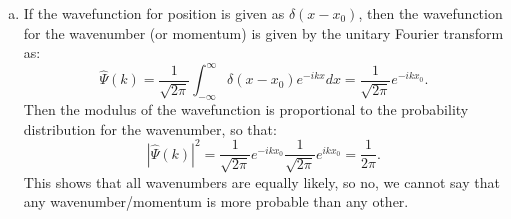 \begin{enumerate}
\begin{enumerate}[a)]
\item If the wavefunction for position is given as $\delta(x - x_0)$, then the wavefunction for the wavenumber (or momentum)
is given by the unitary Fourier transform as:
$$\hat{\Psi}(k) = \frac{1}{\sqrt{2\pi}}\int_{-\infty}^{\infty}\delta(x - x_0)e^{-ik x}dx=\frac{1}{\sqrt{2\pi}}e^{-ikx_{0}}.$$
Then the modulus of the wavefunction is proportional to the probability distribution for the wavenumber, so that:
$$|\hat{\Psi}(k)|^{2}=\frac{1}{\sqrt{2\pi}}e^{-ikx_0}\frac{1}{\sqrt{2\pi}}e^{ikx_0}=\frac{1}{2\pi}.$$
This shows that all wavenumbers are equally likely, so no, we cannot say that any wavenumber/momentum is more probable than any other. 

\end{enumerate}
\end{enumerate}
